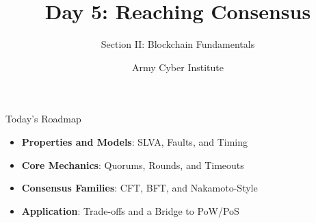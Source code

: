 \documentclass[aspectratio=169]{beamer}
\title[Blockchain II — Day 5]{Day 5: Reaching Consensus}
\subtitle{Section II: Blockchain Fundamentals}
\author{Army Cyber Institute}
\institute{Army Cyber Institute, U.S. Military Academy}
\date{}
\begin{document}
\begin{frame}
    \titlepage
\end{frame}

\begin{frame}{Today's Roadmap}
    \begin{itemize}
        \item \textbf{Properties and Models}: SLVA, Faults, and Timing
        \item \textbf{Core Mechanics}: Quorums, Rounds, and Timeouts
        \item \textbf{Consensus Families}: CFT, BFT, and Nakamoto-Style
        \item \textbf{Application}: Trade-offs and a Bridge to PoW/PoS
    \end{itemize}
\end{frame}
\end{document}
